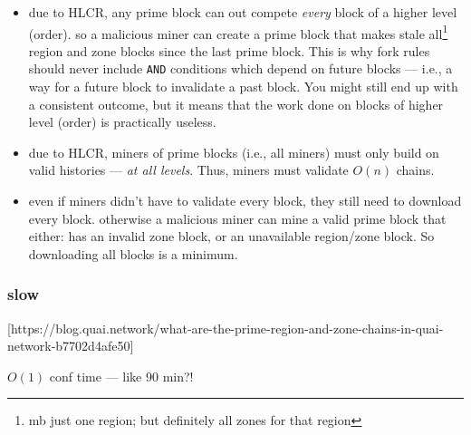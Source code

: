 \begin{itemize}
    \item due to HLCR, any prime block can out compete \emph{every} block of a higher level (order).
    so a malicious miner can create a prime block that makes stale all\footnote{mb just one region; but definitely all zones for that region} region and zone blocks since the last prime block.
    This is why fork rules should never include \texttt{AND} conditions which depend on future blocks --- i.e., a way for a future block to invalidate a past block.
    You might still end up with a consistent outcome, but it means that the work done on blocks of higher level (order) is practically useless.
    \item due to HLCR, miners of prime blocks (i.e., all miners) must only build on valid histories --- \emph{at all levels}.
    Thus, miners must validate $O(n)$ chains.
    \item even if miners didn't have to validate every block, they still need to download every block.
    otherwise a malicious miner can mine a valid prime block that either: has an invalid zone block, or an unavailable region/zone block.
    So downloading all blocks is a minimum.
\end{itemize}



\subsubsection{slow}

[https://blog.quai.network/what-are-the-prime-region-and-zone-chains-in-quai-network-b7702d4afe50]

$O(1)$ conf time --- like 90 min?!
